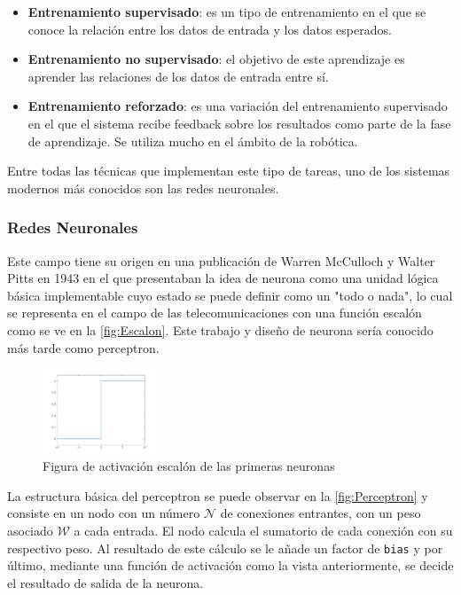 \begin{itemize}
    \item \textbf{Entrenamiento supervisado}: es un tipo de entrenamiento en el que se conoce la relación entre los datos de entrada y los datos esperados. 
    \item \textbf{Entrenamiento no supervisado}: el objetivo de este aprendizaje es aprender las relaciones de los datos de entrada entre sí.
    \item \textbf{Entrenamiento reforzado}: es una variación del entrenamiento supervisado en el que el sistema recibe feedback sobre los resultados como parte de la fase de aprendizaje. Se utiliza 
    mucho en el ámbito de la robótica.
\end{itemize}

Entre todas las técnicas que implementan este tipo de tareas, uno de los sistemas modernos más conocidos son las redes neuronales.

\subsubsection{Redes Neuronales}

Este campo tiene su origen en una publicación de Warren McCulloch y Walter Pitts en 1943\cite{mccullochLOGICALCALCULUSIDEAS} en el que presentaban la idea de neurona como una unidad lógica básica 
implementable cuyo estado se puede definir como un "todo o nada", lo cual se representa en el campo de las telecomunicaciones con una función escalón como se ve en la \autoref{fig:Escalon}. Este 
trabajo y diseño de neurona sería conocido más tarde como perceptron.

\begin{figure}[H]
    \centering
    \includegraphics[width=0.3\textwidth]{images/4/Escalon.png}
    \caption{Figura de activación escalón de las primeras neuronas}
    \label{fig:Escalon}
\end{figure}

La estructura básica del perceptron se puede observar en la \autoref{fig:Perceptron} y consiste en un nodo con un número \(\mathcal{N}\) de conexiones entrantes, con un peso asociado \(\mathcal{W}\) 
a cada entrada. El nodo calcula el sumatorio de cada conexión con su respectivo peso. Al resultado de este cálculo se le añade un factor de \texttt{bias} y por último, mediante una función de 
activación como la vista anteriormente, se decide el resultado de salida de la neurona. 


